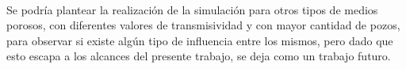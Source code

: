 \documentclass[10pt,a4paper,final]{article}
\begin{document}
\\
Se podría  plantear la realización de la simulación para otros tipos de medios porosos, con diferentes valores de transmisividad y con mayor cantidad de pozos, para observar si existe algún tipo de influencia entre los mismos, pero dado que esto escapa a los alcances del presente trabajo, se deja como un trabajo futuro.
\end{document}
